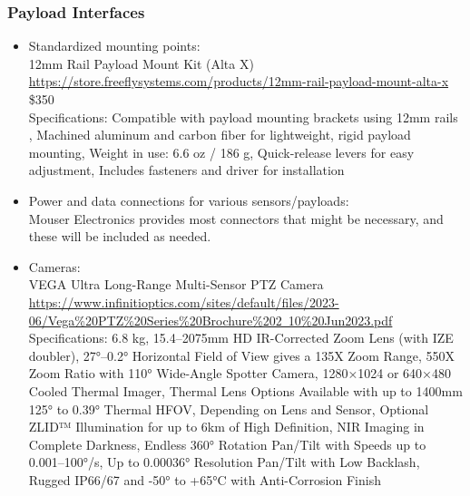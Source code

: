 \subsubsection{Payload Interfaces}
\begin{itemize}
    \item Standardized mounting points: \\
    12mm Rail Payload Mount Kit (Alta X)\\
\href{https://store.freeflysystems.com/products/12mm-rail-payload-mount-alta-x}{https://store.freeflysystems.com/products/12mm-rail-payload-mount-alta-x}\\
\$350\\
Specifications:  Compatible with payload mounting brackets using 12mm rails
, Machined aluminum and carbon fiber for lightweight, rigid payload mounting, Weight in use: 6.6 oz / 186 g, Quick-release levers for easy adjustment, Includes fasteners and driver for installation

    \item Power and data connections for various sensors/payloads: \\
    Mouser Electronics provides most connectors that might be necessary, and these will be included as needed.
    \item Cameras: \\
    VEGA Ultra Long-Range Multi-Sensor PTZ Camera \\ 
\href{https://www.infinitioptics.com/sites/default/files/2023-06/Vega%20PTZ%20Series%20Brochure%202~10%20Jun2023.pdf}{https://www.infinitioptics.com/sites/default/files/2023-06/Vega\%20PTZ\%20Series\%20Brochure\%202~10\%20Jun2023.pdf}
Specifications: 6.8 kg, 15.4–2075mm HD IR-Corrected Zoom Lens (with IZE doubler), 27°–0.2° Horizontal Field of View gives a 135X Zoom Range, 550X Zoom Ratio with 110° Wide-Angle Spotter Camera, 1280×1024 or 640×480 Cooled Thermal Imager, Thermal Lens Options Available with up to 1400mm 125° to 0.39° Thermal HFOV, Depending on Lens and Sensor, Optional ZLID™ Illumination for up to 6km of High Definition, NIR Imaging in Complete Darkness, Endless 360° Rotation Pan/Tilt with Speeds up to 0.001–100°/s, Up to 0.00036° Resolution Pan/Tilt with Low Backlash, Rugged IP66/67 and -50° to +65°C with Anti-Corrosion Finish

\end{itemize}

